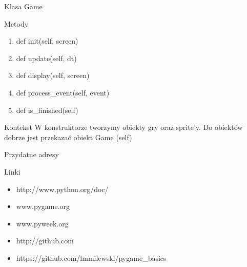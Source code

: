 \documentclass{beamer}
\begin{document}
\begin{frame}{Klasa Game}
  \begin{block}{Metody}
    \begin{enumerate}
    \item def init(self, screen)
    \item def update(self, dt)
    \item def display(self, screen)
    \item def process\_event(self, event)
    \item def is\_finished(self)
    \end{enumerate}
  \end{block}

  \begin{block}{Kontekst}
    W konstruktorze tworzymy obiekty gry oraz sprite'y. Do obiektów
    dobrze jest przekazać obiekt Game (self)
  \end{block}
\end{frame}



\begin{frame}{Przydatne adresy}
  \begin{block}{Linki}
    \begin{itemize}
    \item http://www.python.org/doc/
    \item www.pygame.org
    \item www.pyweek.org
    \item http://github.com
    \item https://github.com/lmmilewski/pygame\_basics
    \end{itemize}
  \end{block}

\end{frame}
\end{document}
